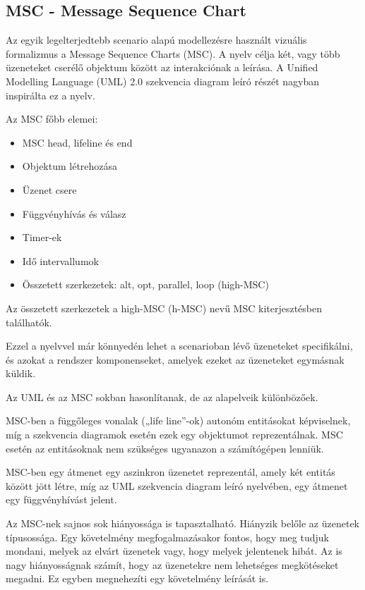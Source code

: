 \subsection{MSC - Message Sequence Chart}

Az egyik legelterjedtebb scenario alapú modellezésre használt vizuális formalizmus a
Message Sequence Charts (MSC). A nyelv célja két, vagy több üzeneteket cserélő
objektum között az interakciónak a leírása. A Unified Modelling Language (UML) 2.0
szekvencia diagram leíró részét nagyban inspirálta ez a nyelv.

Az MSC főbb elemei:

\begin{itemize}
    \item MSC head, lifeline és end
    \item Objektum létrehozása
    \item Üzenet csere
    \item Függvényhívás és válasz
    \item Timer-ek
    \item Idő intervallumok
    \item Összetett szerkezetek: alt, opt, parallel, loop (high-MSC)
\end{itemize}

Az összetett szerkezetek a high-MSC (h-MSC) nevű MSC kiterjesztésben találhatók.

Ezzel a nyelvvel már könnyedén lehet a scenarioban lévő üzeneteket specifikálni, és azokat a
rendszer komponenseket, amelyek ezeket az üzeneteket egymásnak küldik.

Az UML és az MSC sokban hasonlítanak, de az alapelveik különbözőek.

MSC-ben a függőleges vonalak („life line”-ok) autonóm entitásokat képviselnek, míg a
szekvencia diagramok esetén ezek egy objektumot reprezentálnak. MSC esetén az
entitásoknak nem szükséges ugyanazon a számítógépen lenniük.

MSC-ben egy átmenet egy aszinkron üzenetet reprezentál, amely két entitás között jött létre,
míg az UML szekvencia diagram leíró nyelvében, egy átmenet egy függvényhívást jelent.

Az MSC-nek sajnos sok hiányossága is tapasztalható. Hiányzik belőle az üzenetek
típusossága. Egy követelmény megfogalmazásakor fontos, hogy meg tudjuk mondani, melyek
az elvárt üzenetek vagy, hogy melyek jelentenek hibát. Az is nagy hiányosságnak számít,
hogy az üzenetekre nem lehetséges megkötéseket megadni. Ez egyben megnehezíti egy
követelmény leírását is.

